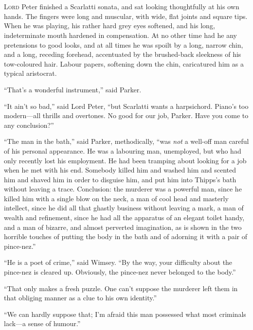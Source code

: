 \chapter[Chapter \thechapter]{}
\lettrine[lines=4]{L}{ord} Peter finished a Scarlatti sonata, and sat looking thoughtfully at his own hands. The fingers were long and muscular, with wide, flat joints and square tips. When he was playing, his rather hard grey eyes softened, and his long, indeterminate mouth hardened in compensation. At no other time had he any pretensions to good looks, and at all times he was spoilt by a long, narrow chin, and a long, receding forehead, accentuated by the brushed-back sleekness of his tow-coloured hair. Labour papers, softening down the chin, caricatured him as a typical aristocrat.

\enquote{That’s a wonderful instrument,} said Parker.

\enquote{It ain’t so bad,} said Lord Peter, \enquote{but Scarlatti wants a harpsichord. Piano’s too modern\allowbreak---\allowbreak all thrills and overtones. No good for our job, Parker. Have you come to any conclusion?}

\enquote{The man in the bath,} said Parker, methodically, \enquote{was \textit{not} a well-off man careful of his personal appearance. He was a labouring man, unemployed, but who had only recently lost his employment. He had been tramping about looking for a job when he met with his end. Somebody killed him and washed him and scented him and shaved him in order to disguise him, and put him into Thipps’s bath without leaving a trace. Conclusion: the murderer was a powerful man, since he killed him with a single blow on the neck, a man of cool head and masterly intellect, since he did all that ghastly business without leaving a mark, a man of wealth and refinement, since he had all the apparatus of an elegant toilet handy, and a man of bizarre, and almost perverted imagination, as is shown in the two horrible touches of putting the body in the bath and of adorning it with a pair of pince-nez.}

\enquote{He is a poet of crime,} said Wimsey. \enquote{By the way, your difficulty about the pince-nez is cleared up. Obviously, the pince-nez never belonged to the body.}

\enquote{That only makes a fresh puzzle. One can’t suppose the murderer left them in that obliging manner as a clue to his own identity.}

\enquote{We can hardly suppose that; I’m afraid this man possessed what most criminals lack\allowbreak---\allowbreak a sense of humour.}

